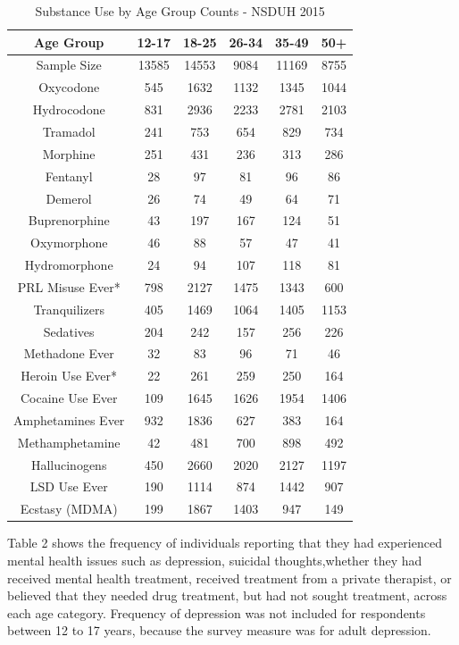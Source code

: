 \documentclass[sigconf]{acmart}
\begin{document}
\begin{table}
  \caption{Substance Use by Age Group Counts - NSDUH 2015
  \cite{samhsa16}}
  \label{tab:freq}
  \begin{tabular}{cccccc}
    \toprule
    Age Group & 12-17& 18-25& 26-34& 35-49& 50+\\
    \midrule
    Sample Size & 13585& 14553& 9084& 11169& 8755 \\
    \midrule
    Oxycodone& 545& 1632& 1132& 1345& 1044 \\
    Hydrocodone& 831& 2936& 2233& 2781& 2103 \\
    Tramadol& 241& 753& 654& 829& 734 \\
    Morphine& 251& 431& 236& 313& 286 \\
    Fentanyl& 28& 97& 81& 96& 86 \\
    Demerol& 26& 74& 49& 64& 71 \\
    Buprenorphine& 43& 197& 167& 124& 51 \\
    Oxymorphone& 46& 88& 57& 47& 41 \\
    Hydromorphone& 24& 94& 107& 118& 81 \\
    \midrule
    PRL Misuse Ever*& 798& 2127& 1475& 1343& 600 \\
    \midrule
    Tranquilizers& 405& 1469& 1064& 1405& 1153 \\
    Sedatives& 204& 242& 157& 256& 226 \\
    Methadone Ever& 32& 83& 96& 71& 46 \\
    \midrule
    Heroin Use Ever*& 22& 261& 259& 250& 164 \\
    \midrule
    Cocaine Use Ever& 109& 1645& 1626& 1954& 1406 \\
    Amphetamines Ever& 932& 1836& 627& 383& 164 \\
    Methamphetamine& 42& 481& 700&  898& 492 \\
    Hallucinogens& 450& 2660& 2020& 2127& 1197 \\
    LSD Use Ever& 190& 1114& 874& 1442& 907 \\
    Ecstasy (MDMA)& 199& 1867& 1403& 947& 149 \\
    \bottomrule
  \end{tabular}
\end{table}


Table 2 shows the frequency of individuals reporting that they had experienced
mental health issues such as depression, suicidal thoughts,whether they had 
received mental health treatment, received treatment from a private therapist, 
or believed that they needed drug treatment, but had not sought treatment, 
across each age category. Frequency of depression was not included for 
respondents between 12 to 17 years, because the survey measure was for 
adult depression. 
\end{document}
